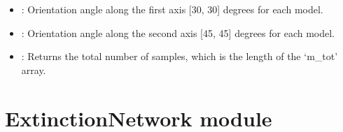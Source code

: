 \documentclass[letterpaper,10pt,english]{sphinxmanual}
\begin{document}
\begin{fulllineitems}
\begin{description}
\begin{itemize}
\item {} 
\sphinxAtStartPar
{}: Orientation angle along the first axis {[}\sphinxhyphen{}30, 30{]} degrees for each model.

\item {} 
\sphinxAtStartPar
{}: Orientation angle along the second axis {[}\sphinxhyphen{}45, 45{]} degrees for each model.

\end{itemize}

\begin{itemize}
\item {} 
\sphinxAtStartPar
{} : Returns the total number of samples, which is the length of the ‘m\_tot’ array.

\end{itemize}

\end{description}

\end{fulllineitems}


\sphinxstepscope


\section{ExtinctionNetwork module}
\label{\detokenize{ExtinctionNetwork:module-ExtinctionNetwork}}\label{\detokenize{ExtinctionNetwork:extinctionnetwork-module}}\label{\detokenize{ExtinctionNetwork::doc}}
\end{document}
